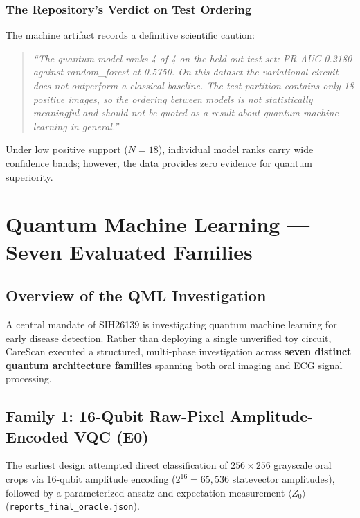 \documentclass[11pt,a4paper]{report}
\newcommand{\artifact}[1]{\texttt{\footnotesize #1}}
\begin{document}
\subsection{The Repository's Verdict on Test Ordering}
The machine artifact records a definitive scientific caution:
\begin{quote}
\textit{``The quantum model ranks 4 of 4 on the held-out test set: PR-AUC 0.2180 against random\_forest at 0.5750. On this dataset the variational circuit does not outperform a classical baseline. The test partition contains only 18 positive images, so the ordering between models is not statistically meaningful and should not be quoted as a result about quantum machine learning in general.''}
\end{quote}
Under low positive support ($N=18$), individual model ranks carry wide confidence bands; however, the data provides zero evidence for quantum superiority.

\chapter{Quantum Machine Learning --- Seven Evaluated Families}

\section{Overview of the QML Investigation}
A central mandate of SIH26139 is investigating quantum machine learning for early disease detection. Rather than deploying a single unverified toy circuit, CareScan executed a structured, multi-phase investigation across \textbf{seven distinct quantum architecture families} spanning both oral imaging and ECG signal processing.

\section{Family 1: 16-Qubit Raw-Pixel Amplitude-Encoded VQC (E0)}
The earliest design attempted direct classification of $256 \times 256$ grayscale oral crops via 16-qubit amplitude encoding ($2^{16} = 65,536$ statevector amplitudes), followed by a parameterized ansatz and expectation measurement $\langle Z_0 \rangle$ (\artifact{reports\_final\_oracle.json}).
\end{document}
